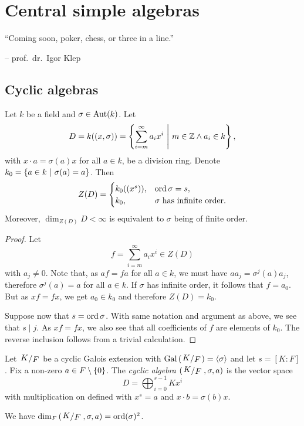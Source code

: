 \section{Central simple algebras}

\epigraph{``Coming soon, poker, chess, or three in a
line.''}{-- prof.~dr.~Igor Klep}

\subsection{Cyclic algebras}

\begin{trditev}
Let $k$ be a field and $\sigma \in \operatorname{Aut}(k)$. Let
\[
D =
k((x, \sigma)) =
\left\{\sum_{i=m}^\infty a_i x^i~\middle\vert~m \in \mathbb{Z} \land a_i \in k\right\},
\]
with $x \cdot a = \sigma(a) x$ for all $a \in k$, be a division
ring. Denote $k_0 = \left\{a \in k~\middle\vert~\sigma(a) = a\right\}$. Then
\[
Z(D) =
\begin{cases}
k_0((x^s)), & \operatorname{ord} \sigma = s, \\
k_0, & \text{$\sigma$ has infinite order}.
\end{cases}
\]
Moreover, $\dim_{Z(D)} D < \infty$ is equivalent to $\sigma$ being
of finite order.
\end{trditev}

\begin{proof}
Let
\[
f = \sum_{i=m}^\infty a_i x^i \in Z(D)
\]
with $a_j \ne 0$. Note that, as $af = fa$ for all $a \in k$, we
must have $a a_j = \sigma^j(a) a_j$, therefore $\sigma^j(a) = a$
for all $a \in k$. If $\sigma$ has infinite order, it follows that
$f = a_0$. But as $xf = fx$, we get $a_0 \in k_0$ and therefore
$Z(D) = k_0$.

Suppose now that $s = \operatorname{ord} \sigma$. With same notation and argument
as above, we see that $s \mid j$. As $xf = fx$, we also see that
all coefficients of $f$ are elements of $k_0$. The reverse
inclusion follows from a trivial calculation.
\end{proof}

\begin{definicija}
Let $\kvoc{K}{F}$ be a cyclic Galois extension with
$\Gal \br{\kvoc{K}{F}} = \skl{\sigma}$ and let $s = [K : F]$. Fix a
non-zero $a \in F \setminus \left\{0\right\}$. The
\emph{cyclic algebra}
$\br{\kvoc{K}{F}, \sigma, a}$
is the vector space
\[
D = \bigoplus_{i=0}^{s-1} K x^i
\]
with multiplication on defined with $x^s = a$ and
$x \cdot b = \sigma(b) x$.
\end{definicija}

\begin{opomba}
We have $\dim_F \br{\kvoc{K}{F}, \sigma, a} = \ord(\sigma)^2$.
\end{opomba}

